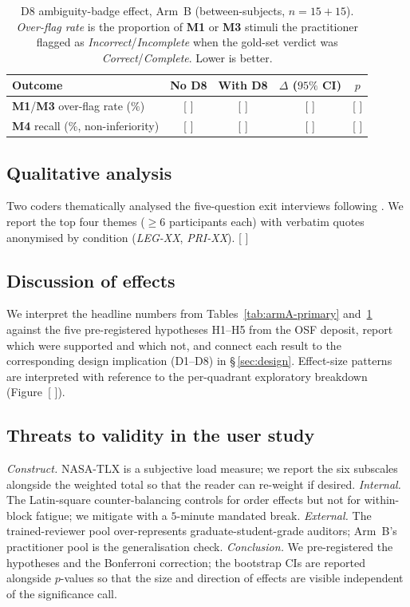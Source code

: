 \documentclass[11pt,a4paper]{article}
\newcommand{\code}[1]{\textsf{\textbf{#1}}}
\begin{document}
\begin{table}[t]
\centering\small
\caption{D8 ambiguity-badge effect, Arm~B (between-subjects,
$n=15+15$). \emph{Over-flag rate} is the proportion of \code{M1}
or \code{M3} stimuli the practitioner flagged as
\emph{Incorrect}/\emph{Incomplete} when the gold-set verdict was
\emph{Correct}/\emph{Complete}. Lower is better.}\label{tab:armB-badge}
\begin{tabular}{lcccc}
\toprule
\textbf{Outcome} & \textbf{No D8} & \textbf{With D8} & \textbf{$\Delta$ ($95\%$ CI)} & \textbf{$p$} \\
\midrule
\code{M1}/\code{M3} over-flag rate ($\%$) & [\,\,] & [\,\,] & [\,\,] & [\,\,] \\
\code{M4} recall ($\%$, non-inferiority)  & [\,\,] & [\,\,] & [\,\,] & [\,\,] \\
\bottomrule
\end{tabular}
\end{table}

\subsection{Qualitative analysis}\label{sec:user-qual}
\noindent
Two coders thematically analysed the five-question exit interviews
following \citet{braun2006using}. We report the top four themes
($\geq 6$ participants each) with verbatim quotes anonymised by
condition (\textit{LEG-XX}, \textit{PRI-XX}). [\,\,]

\subsection{Discussion of effects}\label{sec:user-disc}
\noindent
[\,\,] We interpret the headline numbers from
Tables~\ref{tab:armA-primary} and~\ref{tab:armB-badge} against the
five pre-registered hypotheses H1--H5 from the OSF deposit, report
which were supported and which not, and connect each result to the
corresponding design implication (D1--D8) in
\S\,\ref{sec:design}. Effect-size patterns are interpreted with
reference to the per-quadrant exploratory breakdown
(Figure~[\,\,]).

\subsection{Threats to validity in the user study}\label{sec:user-threats}
\noindent
\emph{Construct.} NASA-TLX is a subjective load measure; we report
the six subscales alongside the weighted total so that the reader
can re-weight if desired. \emph{Internal.} The Latin-square
counter-balancing controls for order effects but not for
within-block fatigue; we mitigate with a $5$-minute mandated break.
\emph{External.} The trained-reviewer pool over-represents
graduate-student-grade auditors; Arm~B's practitioner pool is the
generalisation check. \emph{Conclusion.} We pre-registered the
hypotheses and the Bonferroni correction; the bootstrap CIs are
reported alongside $p$-values so that the size and direction of
effects are visible independent of the significance call.
\end{document}
